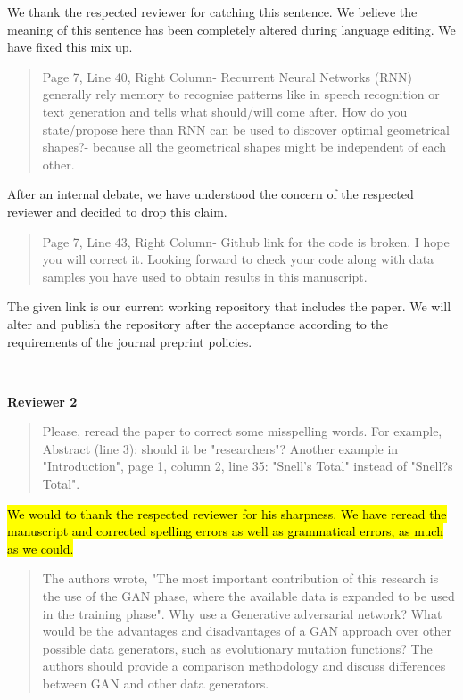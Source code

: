 \documentclass{article}
\begin{document}
	We thank the respected reviewer for catching this sentence. We believe the meaning of this sentence has been completely altered during language editing. We have fixed this mix up. 
	
	\begin{quote}
	Page 7, Line 40, Right Column- Recurrent Neural Networks (RNN) generally rely memory to recognise patterns like in speech recognition or text generation and tells what should/will come after. How do you state/propose here than RNN can be used to discover optimal geometrical shapes?- because all the geometrical shapes might be independent of each other.
	\end{quote}
	
	After an internal debate, we have understood the concern of the respected reviewer and decided to drop this claim.
	
	\begin{quote}
	Page 7, Line 43, Right Column- Github link for the code is broken. I hope you will correct it. Looking forward to check your code along with data samples you have used  to obtain results in this manuscript.
	\end{quote}
	
	The given link is our current working repository that includes the paper. We will alter and publish the repository after the acceptance according to the requirements of the journal preprint policies.
	
	~
	
	{\bfseries\large Reviewer 2}
	
	\begin{quote}
	 Please, reread the paper to correct some misspelling words. For example, Abstract (line 3): should it be "researchers"? Another example in "Introduction", page 1, column 2, line 35: "Snell's Total" instead of "Snell?s Total".
	\end{quote}
	
	\hl{We would to thank the respected reviewer for his sharpness. We have reread the manuscript and corrected spelling errors as well as grammatical errors, as much as we could. }
	
	\begin{quote}
	The authors wrote, "The most important contribution of this research is the use of
the GAN phase, where the available data is expanded to be
used in the training phase". Why use a Generative adversarial network? What would be the advantages and disadvantages of a GAN approach over other possible data generators, such as evolutionary mutation functions? The authors should provide a comparison methodology and discuss differences between GAN and other data generators.
	\end{quote}
	
\end{document}
